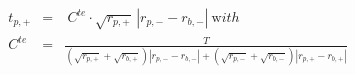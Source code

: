 


\begin{eqnarray*}
  t_{p,+} & = & \ C^{te} \cdot \sqrt{r_{p,+}}\,\left| r_{p,-} - r_{b,-} \right|
                \ {\mathrm with}
\\
   C^{te} & = & \frac{T}
                 {\left( \sqrt{r_{p,+}} + \sqrt{r_{b,+}} \right)
                  \left| r_{p,-} - r_{b,-} \right| + 
                  \left( \sqrt{r_{p,-}} + \sqrt{r_{b,-}} \right)
                  \left| r_{p,+} - r_{b,+} \right|}
\end{eqnarray*}


